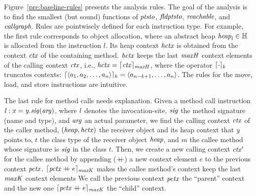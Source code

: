 Figure~\ref{pre:baseline-rules} presents the analysis rules. The goal of the analysis is to find the smallest (but sound) functions of $\textit{ptsto}$, $\textit{fldptsto}$, $\textit{reachable}$, and $\textit{callgraph}$.
Rules are pointwisely defined for each instruction type.  For example, the first rule corresponds to object allocation, where an abstract heap
${\it heap}_l \in \mathbb{H}$ is allocated from the instruction $l$. 
Its heap context ${\it hctx}$ is obtained from the context ${\it ctx}$ of the containing method.
${\it hctx}$ keeps the last ${\it maxH}$ context elements of the calling context ${\it ctx}$, i.e.,
${\it hctx} = {\lceil {\it ctx} \rceil_{{\it maxH}}}$, where the operator
${\lceil \cdot \rceil_{k}}$ truncates contexts:
${\lceil \langle a_1, a_2, \dots, a_n \rangle  \rceil_{k}} = \langle
  a_{n-k+1}, \dots, a_n \rangle$.
The rules for the move, load, and store instructions are intuitive. 


The last rule for method calls needs explanation. 
Given a method call instruction
${\it l: x = y.{\it sig}(arg)}$, where ${\it l}$ denotes the
invocation-site, ${\it sig}$ the method signature (name and type), and
${\it arg}$ an actual parameter, we find the calling context ${\it ctx}$
of the caller method, $({\it heap},{\it hctx})$ the receiver object and its heap
context that {\it y}
points to, $t$ the class type of the receiver object ${\it heap}$, and $m$ 
the callee method whose signature is ${\it sig}$ in the class $t$. 
Then, we create a new calling context ${\it ctx}'$ for the callee
method by appending ($\mathbin{{+}\mspace{-8mu}{+}}$) a new context element $e$
to the previous context ${\it pctx}$.
${\lceil {\it pctx} \mathbin{{+}\mspace{-8mu}{+}} e \rceil_{{\it maxK}}}$ makes the callee method's context keep the last ${\it maxK}$ context elements
We call the previous context ${\it pctx}$ the ``parent'' context and the new
one ${\lceil {\it pctx} \mathbin{{+}\mspace{-8mu}{+}} e \rceil_{{\it maxK}}}$ the ``child''
context.


